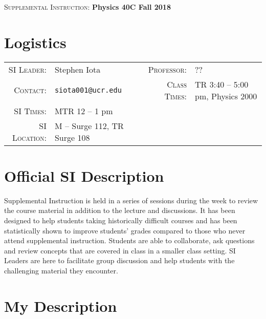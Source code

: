 \documentclass[11pt]{article}
\begin{document}


\begin{center}

\Large{
\textsc{Supplemental Instruction}: \textbf{Physics 40C Fall 2018}
}	
\end{center}





\section*{Logistics}

\begin{tabular}{rlrl}

\textsc{SI Leader}:
&
Stephen Iota
&
\textsc{Professor}:
&
??
\\
\textsc{Contact}:
&
\texttt{siota001@ucr.edu}
&
\textsc{Class Times}:
&
TR 3:40 -- 5:00 pm, Physics 2000
\\
\textsc{SI Times}:
&
MTR 12 -- 1 pm
\\
\textsc{SI Location}:
&
M -- Surge 112, TR Surge 108
\\
\end{tabular}







\section*{Official SI Description}
Supplemental Instruction is held in a series of sessions during the week to review the course material in addition to the lecture and discussions. It has been designed to help students taking historically difficult courses and has been statistically shown to improve students' grades compared to those who never attend supplemental instruction. Students are able to collaborate, ask questions and review concepts that are covered in class in a smaller class setting. SI Leaders are here to facilitate group discussion and help students with the challenging material they encounter. 

\section*{My Description}
\end{document}
